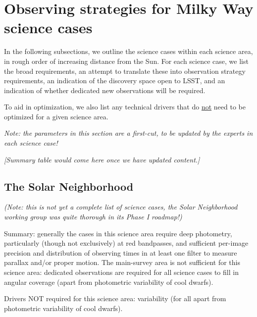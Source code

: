 \section{Observing strategies for Milky Way science cases}\label{Galaxy_Strategies}

In the following subsections, we outline the science cases within each
science area, in rough order of increasing distance from the Sun. For
each science case, we list the broad requirements, an attempt to
translate these into observation strategy requirements, an indication
of the discovery space open to LSST, and an indication of whether
dedicated new observations will be required.

To aid in optimization, we also list any technical drivers that do
\underline{not} need to be optimized for a given science area.

{\it Note: the parameters in this section are a first-cut, to be
  updated by the experts in each science case!}

{\it [Summary table would come here once we have updated content.]}

\subsection{The Solar Neighborhood}

{\it (Note: this is not yet a complete list of science cases, the
  Solar Neighborhood working group was quite thorough in its Phase I
  roadmap!)}

Summary: generally the cases in this science area require deep
photometry, particularly (though not exclusively) at red bandpasses,
and sufficient per-image precision and distribution of observing times
in at least one filter to measure parallax and/or proper motion. The
main-survey area is not sufficient for this science area: dedicated
observations are required for all science cases to fill in angular
coverage (apart from photometric variability of cool dwarfs).

Drivers NOT required for this science area: variability (for all apart from photometric variability of cool dwarfs).
\vspace{-2mm} 

